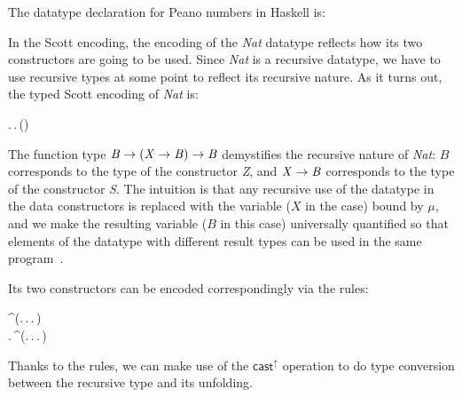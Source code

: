 The datatype declaration for Peano numbers in Haskell is:
\begin{hscode}\SaveRestoreHook
{}%
%
%
\>[4]{}\;\mathrel{=}\mid {}\;\<[E]%
\ColumnHook
\end{hscode}\resethooks
In the Scott encoding, the encoding of the \emph{Nat} datatype
reflects how its two constructors are going to be used. Since
\emph{Nat} is a recursive datatype, we have to use recursive types at
some point to reflect its recursive nature. As it turns out, the typed
Scott encoding of \emph{Nat} is:
\begin{hscode}\SaveRestoreHook
{}%
%
%
\>[3]{}\mu\;\mathbin{:}\star.\,\Pi\;\mathbin{:}\star.\,\to (\to {})\to {}\<[E]%
\ColumnHook
\end{hscode}\resethooks
The function type \ensuremath{\Conid{B}\to (\Conid{X}\to \Conid{B})\to \Conid{B}} demystifies the recursive
nature of \emph{Nat}: $B$ corresponds to the type of the constructor
\emph{Z}, and \ensuremath{\Conid{X}\to \Conid{B}} corresponds to the type of the constructor
\emph{S}. The intuition is that any recursive use of the datatype in
the data constructors is replaced with the variable ($X$ in the case)
bound by $\mu$, and we make the resulting variable ($B$ in this case)
universally quantified so that elements of the datatype with different
result types can be used in the same program~\cite{gadts}.

Its two constructors can be encoded correspondingly via the \cast rules:
\begin{hscode}\SaveRestoreHook
{}%
%
%
\>[3]{}\mathrel{=}^\uparrow{}\;(\lambda {}\mathbin{:}\star.\,\lambda {}\mathbin{:}.\,\lambda {}\mathbin{:}\to {}.\,){}\<[E]%
\\
\>[3]{}\mathrel{=}\lambda {}\mathbin{:}.\,^\uparrow{}\;(\lambda {}\mathbin{:}\star.\,\lambda {}\mathbin{:}.\,\lambda {}\mathbin{:}\to {}.\,\;){}\<[E]%
\ColumnHook
\end{hscode}\resethooks
Thanks to the \cast rules, we can make use of the $ \mathsf{cast}^{\uparrow} $
operation to do type conversion between the recursive type and its
unfolding.

